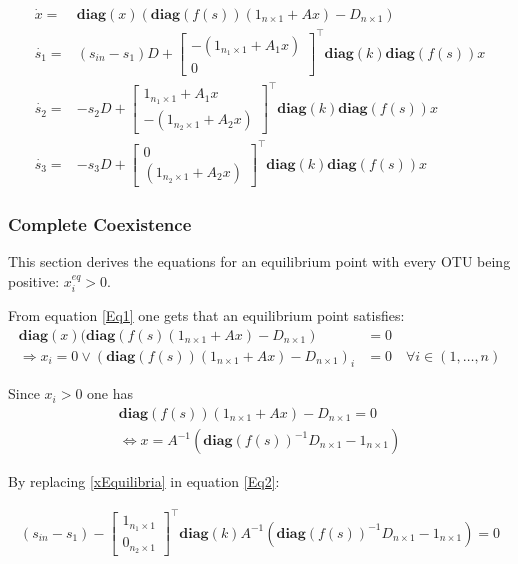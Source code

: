 \documentclass[3p,times]{elsarticle}
\newcommand{\diag}{\textbf{diag}}
\begin{document}
\begin{align}
\label{Eq1}	\dot{x} = & \diag(x)(\diag(f(s))(1_{n\times 1} + Ax) - D_{n\times 1}) \\
\label{Eq2}	\dot{s_1} = & (s_{in}-s_1)D + \begin{bmatrix}
-(1_{n_1\times 1} +A_1x) \\0
\end{bmatrix}^\top \diag(k) \diag(f(s))x \\
\label{Eq3}	\dot{s_2} = & -s_2D+
\begin{bmatrix}
1_{n_1\times 1} +A_1x \\ -(1_{n_2\times 1} +A_2x)
\end{bmatrix}^\top \diag(k) \diag(f(s))x \\	
\label{Eq4}	\dot{s_3} = & -s_3D+\begin{bmatrix}
0	\\(1_{n_2\times 1} +A_2x) 
\end{bmatrix}^\top \diag(k) \diag(f(s))x 
\end{align} 


\subsubsection{Complete Coexistence}

This section derives the equations for an equilibrium point with every OTU being positive: $x^{eq}_i>0$. 

From equation \eqref{Eq1} one gets that an equilibrium point satisfies: \begin{align*}
\diag(x)(\diag(f(s)(1_{n\times 1} + Ax) - D_{n\times 1}) & = 0 \\
\Rightarrow x_i = 0 \vee (\diag (f(s))(1_{n\times 1} + Ax) - D_{n\times 1})_i & = 0 \quad \forall i\in (1,\dots,n)
\end{align*}

Since $x_i>0$ one has 
\begin{align}
\diag(f(s))(1_{n\times 1} + Ax) - D_{n\times 1}=0 \\
\label{xEquilibria}\Leftrightarrow x = A^{-1}(\diag (f(s))^{-1}D_{n\times 1} - 1_{n\times 1})
\end{align}  

By replacing \eqref{xEquilibria} in equation \eqref{Eq2}:


\begin{align}
\label{s1Equilibria} (s_{in}-s_1)-	\begin{bmatrix}
1_{n_1\times 1} \\0_{n_2\times 1}
\end{bmatrix}^\top \diag (k) A^{-1}(\diag(f(s))^{-1}D_{n\times 1}-1_{n\times 1}) = 0 
\end{align}
\end{document}
